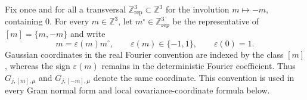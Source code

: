 \documentclass[10pt]{amsart}
\numberwithin{equation}{section}
\theoremstyle{plain}
\theoremstyle{definition}
\theoremstyle{remark}
\begin{document}
Fix once and for all a transversal $\mathbb Z^3_{\mathrm{rep}}\subset\mathbb Z^3$ for the involution $m\mapsto-m$, containing $0$.  For every $m\in\mathbb Z^3$, let $m^\circ\in\mathbb Z^3_{\mathrm{rep}}$ be the representative of $[m]=\{m,-m\}$ and write
\begin{equation}\label{eq:fourier-involution-representative}
        m=\varepsilon(m)m^\circ,
        \qquad \varepsilon(m)\in\{-1,1\},
        \qquad \varepsilon(0)=1.
\end{equation}
Gaussian coordinates in the real Fourier convention are indexed by the class $[m]$, whereas the sign $\varepsilon(m)$ remains in the deterministic Fourier coefficient.  Thus $G_{j,[m],\mu}$ and $G_{j,[-m],\mu}$ denote the same coordinate.  This convention is used in every Gram normal form and local covariance-coordinate formula below.
\end{document}
